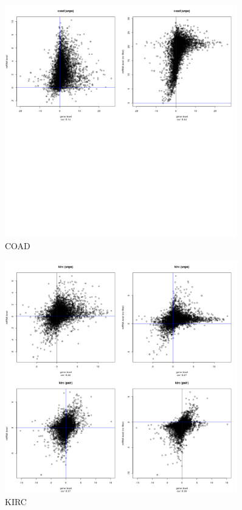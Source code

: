 \documentclass[a4paper,12pt]{article}
\begin{document}
\newpage

\begin{figure}[!h] 
\centering 
\includegraphics[width=0.9\textwidth]{plots/gene_vs_mirna_level_gsa_coad.png} 
\caption{COAD} 
\end{figure} 

\newpage

\begin{figure}[!h] 
\centering 
\includegraphics[width=0.9\textwidth]{plots/gene_vs_mirna_level_gsa_kirc.png} 
\caption{KIRC} 
\end{figure} 
\end{document}
